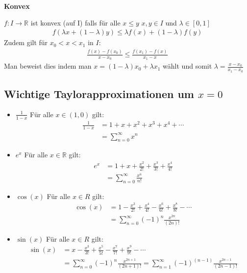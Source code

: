 \documentclass[25pt]{sciposter}
\newcommand{\R}{\mathbb{R}}
\newenvironment{method}[1]{\begin{mdframed}[backgroundcolor=blue!10,innertopmargin=15pt, innerbottommargin=15pt]
		\textbf{#1 }
	}
	{ 
	\end{mdframed}
}
\begin{document}
\begin{multicols}{3}
\begin{method}{Konvex}
	$f : I \to \R$ ist konvex (auf I) falls für alle $x \leq y$ $x,y \in I$ und $\lambda \in [0,1]$
	\begin{align*}
	f(\lambda x + (1-\lambda)y) \leq \lambda f(x) + (1-\lambda)f(y)
	\end{align*}
	Zudem gilt für $x_0 < x< x_1$ in $I$:
	\begin{align*}
	 \frac{f(x) - f(x_0)}{x-x_0} \leq \frac{f(x_1) - f(x)}{x_1 - x}
	\end{align*}
	Man beweist dies indem man $x = (1-\lambda) x_0 + \lambda x_1$ wählt und somit $\lambda = \frac{x-x_0}{x_1 - x_0}$
\end{method}




\subsection*{Wichtige Taylorapproximationen um $x=0$}
\begin{itemize}
	\item $\boxed{\frac{1}{1-x}}$ Für alle $x \in (1,0)$ gilt:
	\begin{align*}
	{\frac{1}{1-x}} &= 1 + x + x^2 + x^3 + x^4 + \cdots \\
	&= \sum_{n=0}^{\infty} x^n
	\end{align*}	
	
	\item $\boxed{e^x}$ Für alle $x \in \R$ gilt:
	\begin{align*}
		e^x &= 1 + x + \frac{x^2}{2!} + \frac{x^3}{3!} + \frac{x^4}{4!}\\
		&= \sum_{n=0}^{\infty} \frac{x^n}{n!}
	\end{align*}
	
	\item $\boxed{\cos(x)}$ Für alle $x\in R$ gilt:
	\begin{align*}
	\cos(x) &= 1 - \frac{x^2}{2!} + \frac{x^4}{4!} - \frac{x^6}{6!} + \frac{x^8}{8!} - \cdots  \\
	&= \sum_{n=0}^{\infty} (-1)^n \frac{x^{2n}}{(2n)!}
	\end{align*}
	
	\item $\boxed{\sin(x)}$ Für alle $x\in R$ gilt:
	\begin{align*}
	\sin(x) &=  x - \frac{x^3}{3!} + \frac{x^5}{5!} - \frac{x^7}{7!} + \frac{x^9}{9!} - \cdots\\
	&= \sum_{n=0}^{\infty} (-1)^n \frac{x^{2n+1}}{(2n+1)!} = \sum_{n=1}^{\infty} (-1)^{(n-1)} \frac{x^{2n-1}}{(2n-1)!}
	\end{align*}


\end{itemize}
\end{multicols}
\end{document}
